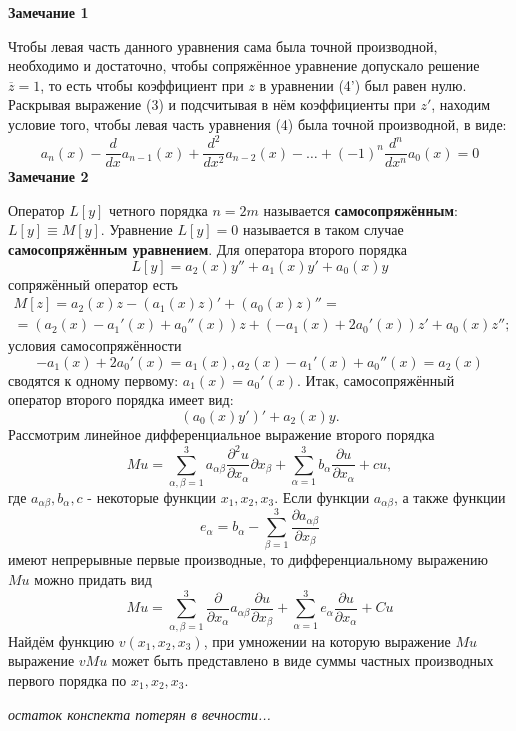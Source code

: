 \textbf{Замечание 1}

Чтобы левая часть данного уравнения сама была точной производной, необходимо и достаточно, чтобы сопряжённое уравнение допускало решение $\overline{z}=1$, то есть чтобы коэффициент при $z$ в уравнении (4') был равен нулю. Раскрывая выражение (3) и подсчитывая в нём коэффициенты при $z'$, находим условие того, чтобы левая часть уравнения (4) была точной производной, в виде:
\[
	a_n (x) - \frac{d}{dx} a_{n-1} (x) + \frac{d^2}{dx^2} a_{n-2} (x) - \dots + (-1)^n \frac{d^n}{dx^n} a_0(x) = 0
\]
\textbf{Замечание 2}

Оператор $L[y]$ четного порядка $n=2m$ называется \textbf{самосопряжённым}: $L[y] \equiv M[y]$. Уравнение $L[y]=0$ называется в таком случае \textbf{самосопряжённым уравнением}. Для оператора второго порядка
\[
	L[y] = a_2 (x) y'' + a_1 (x) y' + a_0 (x) y
\]
сопряжённый оператор есть
\[
	\begin{aligned}
	M[z] = a_2 (x)z - (a_1(x)z)' + (a_0(x)z)'' =  \\
	= (a_2 (x) - a_1'(x) + a_0''(x))z+ (-a_1(x)+2a_0'(x))z'+a_0(x)z'';
\end{aligned}
\]
условия самосопряжённости
\[
	-a_1(x)+2a_0'(x)=a_1(x), a_2(x)-a_1'(x)+a_0''(x)=a_2(x)
\]
сводятся к одному первому: $a_1(x) = a_0'(x)$. Итак, самосопряжённый оператор второго порядка имеет вид:
\[
	(a_0(x)y')'+a_2(x)y.
\]
Рассмотрим линейное дифференциальное выражение второго порядка
\[
	Mu = \sum_{\alpha,\beta=1}^3 a_{\alpha\beta} \frac{\partial^2 u}{\partial x_\alpha}{\partial x_\beta} + \sum_{\alpha=1}^3 b_\alpha \frac{\partial u}{\partial x_\alpha} + cu, \tag{6}
\]
где $a_{\alpha\beta}, b_\alpha, c$ - некоторые функции $x_1, x_2, x_3$. Если функции $a_{\alpha\beta}$, а также функции
\[
	e_\alpha = b_\alpha - \sum_{\beta = 1}^3 \frac{\partial a_{\alpha \beta}}{\partial x_\beta} \tag{7}
\]
имеют непрерывные первые производные, то дифференциальному выражению $Mu$ можно придать вид
\[
	Mu = \sum_{\alpha,\beta=1}^3\frac{\partial}{\partial x_\alpha} a_{\alpha \beta} \frac{\partial u}{\partial x_\beta} + \sum_{\alpha=1}^3 e_\alpha \frac{\partial u}{\partial x_\alpha} + Cu \tag{8}
\]
Найдём функцию $v(x_1,x_2,x_3)$, при умножении на которую выражение $Mu$ выражение $vMu$ может быть представлено в виде суммы частных производных первого порядка по $x_1, x_2, x_3$.

\textit{остаток конспекта потерян в вечности...}
